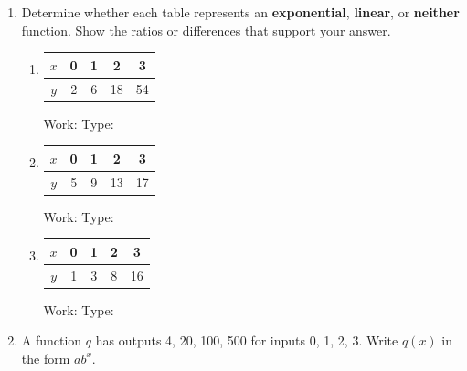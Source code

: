 \documentclass[10pt]{article}
\begin{document}
\begin{enumerate}[itemsep=16pt]
\item Determine whether each table represents an \textbf{exponential}, \textbf{linear}, or
      \textbf{neither} function. Show the ratios or differences that support your answer.

      \begin{enumerate}[label=(\alph*), itemsep=12pt]
        \item \renewcommand{\arraystretch}{1.3}
              \begin{tabular}{|c|c|c|c|c|}
              \hline
              $x$ & 0 & 1 & 2 & 3 \\ \hline
              $y$ & 2 & 6 & 18 & 54 \\ \hline
              \end{tabular}

              \vspace{0.04in}
              Work: \blank{6cm} \quad Type: \smash{\gradedblank[id=hw2a, type=short, check=text, points=1, answer={exponential}]{3cm}{13pt}}

        \item \renewcommand{\arraystretch}{1.3}
              \begin{tabular}{|c|c|c|c|c|}
              \hline
              $x$ & 0 & 1 & 2 & 3 \\ \hline
              $y$ & 5 & 9 & 13 & 17 \\ \hline
              \end{tabular}

              \vspace{0.04in}
              Work: \blank{6cm} \quad Type: \smash{\gradedblank[id=hw2b, type=short, check=text, points=1, answer={linear}]{3cm}{13pt}}

        \item \renewcommand{\arraystretch}{1.3}
              \begin{tabular}{|c|c|c|c|c|}
              \hline
              $x$ & 0 & 1 & 2 & 3 \\ \hline
              $y$ & 1 & 3 & 8 & 16 \\ \hline
              \end{tabular}

              \vspace{0.04in}
              Work: \blank{6cm} \quad Type: \smash{\gradedblank[id=hw2c, type=short, check=text, points=1, answer={neither}]{3cm}{13pt}}
      \end{enumerate}

\item A function $q$ has outputs 4, 20, 100, 500 for inputs 0, 1, 2, 3. Write $q(x)$
      in the form $ab^x$.


\end{enumerate}
\end{document}
